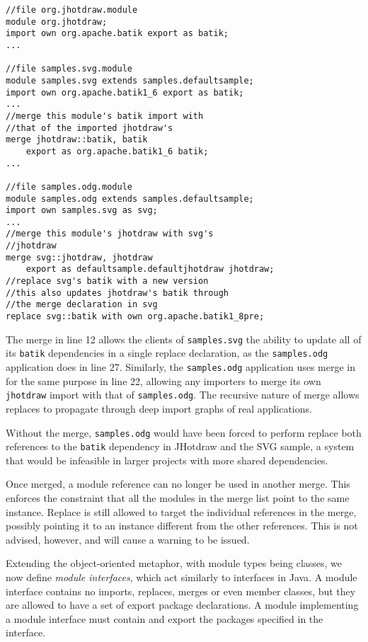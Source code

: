 \begin{lstlisting}[caption=Merge]
//file org.jhotdraw.module
module org.jhotdraw;
import own org.apache.batik export as batik;
...

//file samples.svg.module
module samples.svg extends samples.defaultsample;
import own org.apache.batik1_6 export as batik;
...
//merge this module's batik import with
//that of the imported jhotdraw's
merge jhotdraw::batik, batik 
	export as org.apache.batik1_6 batik;
...

//file samples.odg.module
module samples.odg extends samples.defaultsample;
import own samples.svg as svg;
...
//merge this module's jhotdraw with svg's
//jhotdraw
merge svg::jhotdraw, jhotdraw 
	export as defaultsample.defaultjhotdraw jhotdraw;
//replace svg's batik with a new version
//this also updates jhotdraw's batik through
//the merge declaration in svg
replace svg::batik with own org.apache.batik1_8pre;
\end{lstlisting}


The merge in line 12 allows the clients of \texttt{samples.svg}
the ability to update all of its \texttt{batik} dependencies
in a single replace declaration, as the \texttt{samples.odg}
application does in line 27. Similarly, the \texttt{samples.odg} application
uses merge in for the same purpose in line 22, allowing any importers
to merge its own \texttt{jhotdraw} import with that of \texttt{samples.odg}.
The recursive nature of merge allows replaces to propagate through deep
import graphs of real applications. 

Without the merge, \texttt{samples.odg}
would have been forced to perform replace both references to the \texttt{batik} dependency
in JHotdraw and the SVG sample, a system that would be infeasible in larger projects
with more shared dependencies.

Once merged, a module reference can no longer be used in another merge. This
enforces the constraint that all the modules in the merge list point to the
same instance. Replace is still allowed to target the individual 
references in the merge, possibly pointing it to an instance different from
the other references. This is not advised, however, and will cause a warning to be
issued.


Extending the object-oriented metaphor, with module types being classes, we 
now define \textit{module interfaces}, which act similarly to interfaces in Java. A module
interface contains no imports, replaces, merges or even member classes, but they
are allowed to have a set of export package declarations. A module implementing
a module interface must contain and export the packages specified in the interface.

